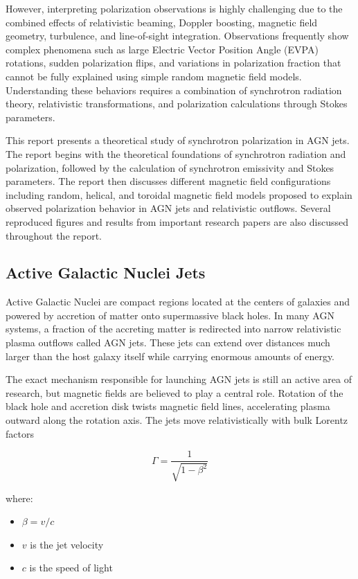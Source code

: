 \documentclass{article}
\begin{document}
However, interpreting polarization observations is highly challenging due to the combined effects of relativistic beaming, Doppler boosting, magnetic field geometry, turbulence, and line-of-sight integration. Observations frequently show complex phenomena such as large Electric Vector Position Angle (EVPA) rotations, sudden polarization flips, and variations in polarization fraction that cannot be fully explained using simple random magnetic field models. Understanding these behaviors requires a combination of synchrotron radiation theory, relativistic transformations, and polarization calculations through Stokes parameters.

This report presents a theoretical study of synchrotron polarization in AGN jets. The report begins with the theoretical foundations of synchrotron radiation and polarization, followed by the calculation of synchrotron emissivity and Stokes parameters. The report then discusses different magnetic field configurations including random, helical, and toroidal magnetic field models proposed to explain observed polarization behavior in AGN jets and relativistic outflows. Several reproduced figures and results from important research papers are also discussed throughout the report.

\subsection{Active Galactic Nuclei Jets}

Active Galactic Nuclei are compact regions located at the centers of galaxies and powered by accretion of matter onto supermassive black holes. In many AGN systems, a fraction of the accreting matter is redirected into narrow relativistic plasma outflows called AGN jets. These jets can extend over distances much larger than the host galaxy itself while carrying enormous amounts of energy.

The exact mechanism responsible for launching AGN jets is still an active area of research, but magnetic fields are believed to play a central role. Rotation of the black hole and accretion disk twists magnetic field lines, accelerating plasma outward along the rotation axis. The jets move relativistically with bulk Lorentz factors

\begin{equation}
\Gamma = \frac{1}{\sqrt{1-\beta^2}}
\end{equation}

where:
\begin{itemize}
    \item \(\beta = v/c\)
    \item \(v\) is the jet velocity
    \item \(c\) is the speed of light
\end{itemize}
\end{document}
